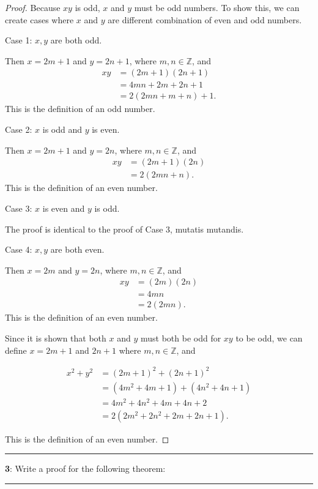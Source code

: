 \documentclass[11pt]{article}
\newcommand\question[2]{\vspace{.25in}\hrule\textbf{#1}: #2\vspace{.5em}\hrule\vspace{.10in}}
\newcommand{\Z}{\mathbb{Z}}
\begin{document}
\begin{proof}
	Because $xy$ is odd, $x$ and $y$ must be odd numbers. To show this, we can create cases where $x$ and $y$ are different combination of even and odd numbers.

	Case 1: $x, y$ are both odd.

	Then $x=2m+1$ and $y=2n+1$, where $m,n \in \Z$, and
	\begin{align*}
		xy &= (2m+1)(2n+1)\\
		&= 4mn + 2m + 2n + 1\\
		&= 2 (2mn + m + n) + 1.
	\end{align*}
	This is the definition of an odd number.

	Case 2: $x$ is odd and $y$ is even.
	
	Then $x=2m+1$ and $y=2n$, where $m,n \in \Z$, and
	\begin{align*}
		xy &= (2m+1)(2n)\\
		&= 2(2mn+n).
	\end{align*}
	This is the definition of an even number.
	
	Case 3: $x$ is even and $y$ is odd.
	
	The proof is identical to the proof of Case 3, mutatis mutandis.
	
	Case 4: $x,y$ are both even.
	
	Then $x=2m$ and $y=2n$, where $m,n \in \Z$, and
	\begin{align*}
		xy &= (2m)(2n)\\
		&= 4mn\\
		&= 2(2mn).
	\end{align*}
	This is the definition of an even number.

	Since it is shown that both $x$ and $y$ must both be odd for $xy$ to be odd, we can define $x=2m+1$ and $2n+1$ where $m, n \in \Z$, and

	\begin{align*}
		x^2+y^2 &= (2m+1)^2 + (2n+1)^2\\
		&= (4m^2 + 4m + 1) + (4n^2 + 4n + 1)\\
		&= 4m^2+4n^2+4m+4n+2\\
		&= 2(2m^2+2n^2+2m+2n+1).
	\end{align*}

	This is the definition of an even number.

\end{proof}


\question{3}{Write a proof for the following theorem:}
\end{document}
